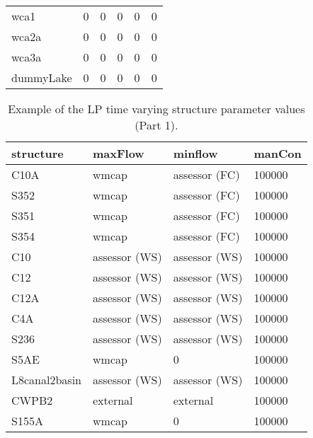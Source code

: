 \begin{table}[!htb]
\begin{center}
\begin{tabular}{p{2.5cm}p{2.2cm}p{2.2cm}p{2.2cm}p{2.2cm}p{2.2cm}}
  wca1            &   0         &    0          &    0         &     0         &    0 \\
  wca2a           &   0         &    0          &    0         &     0         &    0 \\
  wca3a           &   0         &    0          &    0         &     0         &    0 \\
  dummyLake       &   0         &    0          &    0         &     0         &    0 \\
  \hline
  \end{tabular}
 \end{center}
\end{table}
\normalsize

\begin{table}[!htb]
 \begin{center}
  \footnotesize
  \caption{Example of the LP time varying structure parameter values (Part 1). }\label{strParaTs_1}
  \begin{tabular}{p{2.5cm}p{2.0cm}p{2.0cm}p{2.0cm}}            \\[0.8ex]
  structure        &maxFlow         &minflow          &manCon  \\
  \hline
  C10A             &wmcap           &assessor (FC)    & 100000  \\
  S352             &wmcap           &assessor (FC)    & 100000  \\
  S351             &wmcap           &assessor (FC)    & 100000  \\
  S354             &wmcap           &assessor (FC)    & 100000  \\
  C10              &assessor (WS)   &assessor (WS)    & 100000  \\
  C12              &assessor (WS)   &assessor (WS)    & 100000  \\
  C12A             &assessor (WS)   &assessor (WS)    & 100000  \\
  C4A              &assessor (WS)   &assessor (WS)    & 100000  \\
  S236             &assessor (WS)   &assessor (WS)    & 100000  \\
  S5AE             &wmcap           & 0               & 100000  \\
  L8canal2basin    &assessor (WS)   &assessor (WS)    & 100000  \\
  CWPB2            &external        &external         & 100000  \\
  S155A            &wmcap           & 0               & 100000  \\

\end{tabular}
\end{center}
\end{table}
